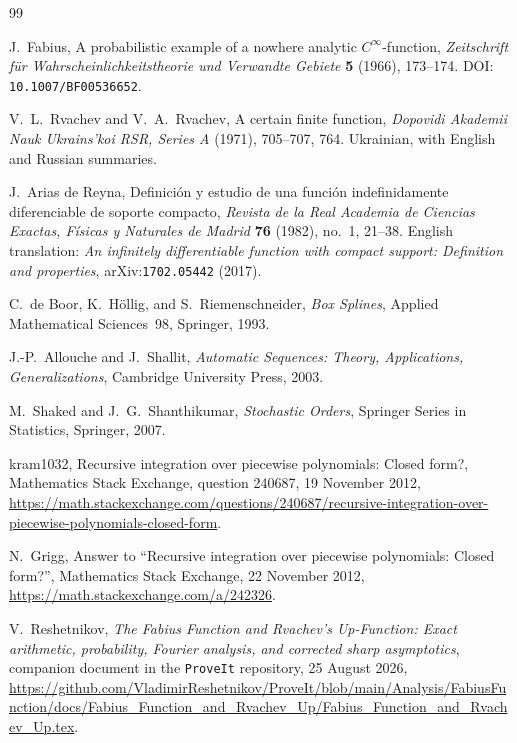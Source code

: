 \documentclass[11pt,oneside]{article}
\theoremstyle{definition}
\theoremstyle{remark}
\begin{document}
\renewcommand{\refname}{Dossier references}
\begin{thebibliography}{99}

J.~Fabius,
\newblock A probabilistic example of a nowhere analytic $C^\infty$-function,
\newblock \emph{Zeitschrift für Wahrscheinlichkeitstheorie und Verwandte Gebiete}
  \textbf{5} (1966), 173--174.
\newblock DOI: \nolinkurl{10.1007/BF00536652}.

V.~L.~Rvachev and V.~A.~Rvachev,
\newblock A certain finite function,
\newblock \emph{Dopovidi Akademii Nauk Ukrains'koi RSR, Series A}
  (1971), 705--707, 764.  Ukrainian, with English and Russian summaries.

J.~Arias de Reyna,
\newblock Definición y estudio de una función indefinidamente diferenciable de soporte compacto,
\newblock \emph{Revista de la Real Academia de Ciencias Exactas, Físicas y Naturales de Madrid}
  \textbf{76} (1982), no.~1, 21--38.
\newblock English translation: \emph{An infinitely differentiable function with compact
support: Definition and properties}, arXiv:\nolinkurl{1702.05442} (2017).

C.~de Boor, K.~Höllig, and S.~Riemenschneider,
\newblock \emph{Box Splines},
\newblock Applied Mathematical Sciences~98, Springer, 1993.

J.-P.~Allouche and J.~Shallit,
\newblock \emph{Automatic Sequences: Theory, Applications, Generalizations},
\newblock Cambridge University Press, 2003.

M.~Shaked and J.~G.~Shanthikumar,
\newblock \emph{Stochastic Orders},
\newblock Springer Series in Statistics, Springer, 2007.

kram1032,
\newblock Recursive integration over piecewise polynomials: Closed form?,
\newblock Mathematics Stack Exchange, question 240687, 19 November 2012,
\newblock \url{https://math.stackexchange.com/questions/240687/recursive-integration-over-piecewise-polynomials-closed-form}.

N.~Grigg,
\newblock Answer to ``Recursive integration over piecewise polynomials: Closed form?'',
\newblock Mathematics Stack Exchange, 22 November 2012,
\newblock \url{https://math.stackexchange.com/a/242326}.

V.~Reshetnikov,
\newblock \emph{The Fabius Function and Rvachev's Up-Function: Exact arithmetic,
probability, Fourier analysis, and corrected sharp asymptotics},
\newblock companion document in the \texttt{ProveIt} repository, 25 August 2026,
\newblock \url{https://github.com/VladimirReshetnikov/ProveIt/blob/main/Analysis/FabiusFunction/docs/Fabius_Function_and_Rvachev_Up/Fabius_Function_and_Rvachev_Up.tex}.


\end{thebibliography}
\end{document}
